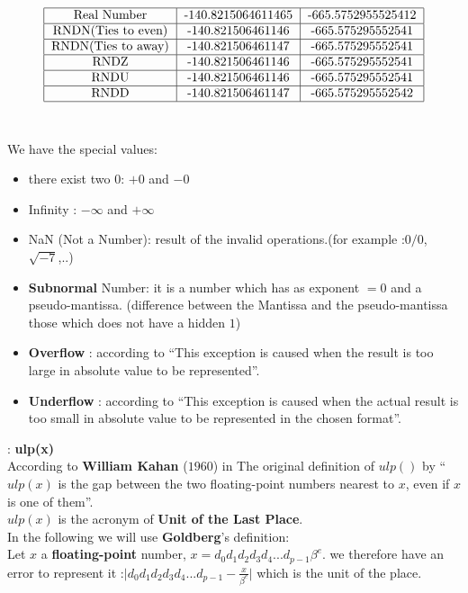 \begin{table}[hbtp]
        \centering   
$$\begin{tabular}{|c|c|c|}
    \hline
    Real Number & -140.8215064611465 & -665.5752955525412\\
    \hline
    RNDN(Ties to even) & -140.821506461146 & -665.575295552541\\
    \hline
    RNDN(Ties to away) & -140.821506461147 & -665.575295552541\\
    \hline
    RNDZ & -140.821506461146 & -665.575295552541\\
    \hline
    RNDU & -140.821506461146 & -665.575295552541\\ 
    \hline
    RNDD & -140.821506461147 & -665.575295552542\\
    \hline
    \end{tabular}$$ \\
\caption{roundings with negative reals}
   \label{tab:negative reals}     
    \end{table}
 
 We have the special values:
\begin{itemize}
    \item there exist two $0$: $+0$ and $-0$
    \item Infinity : $-\infty$ and $+\infty$
    \item NaN (Not a Number): result of the invalid operations.(for example :$0/0$, $\sqrt{-7}$,..)
    \item \textbf{Subnormal} Number: it is a number which has as exponent $=0$ and a pseudo-mantissa. (difference between the Mantissa and the pseudo-mantissa those which does not have a hidden $1$)
    \item   \textbf{Overflow} : according to \cite{belaid2013resolution} \enquote{This exception is caused when the result is too large in absolute value to be represented}.     
    \item \textbf{Underflow} : according to \cite{belaid2013resolution}  \enquote{This exception is caused when the actual result is too small in absolute value to be represented in the chosen format}. 
\end{itemize} 

\begin{defin}: \textbf{ulp(x)} \\
 According to \textbf{William Kahan} ($1960$) in \cite{muller2010handbook} The original definition of $ulp()$ by  \enquote{$ulp(x)$ is the gap between the two floating-point numbers nearest to $x$, even if $x$ is one of them}.\\
 $ulp(x)$ is the acronym of \textbf{Unit of the Last Place}. \\
 In the following we will use \textbf{Goldberg}'s definition:\\
Let $x$ a \textbf{floating-point} number, $x = d_0d_1d_2d_3d_4...d_{p-1}\beta^e$. we therefore have an error to represent it :$\lvert d_0d_1d_2d_3d_4...d_{p-1} - \frac{x}{\beta^e} \rvert $ which is the unit of the place.
\end{defin}


